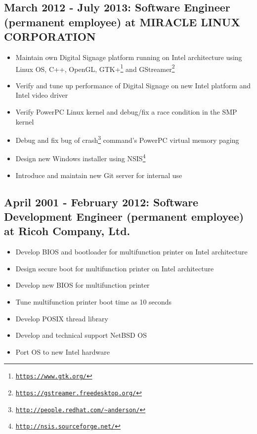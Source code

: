 \documentclass[letterpaper]{article}
\begin{document}
\subsection*{March 2012 - July 2013: Software Engineer (permanent employee) at MIRACLE LINUX CORPORATION}

\begin{itemize}
  \item Maintain own Digital Signage platform running on Intel architecture using Linux OS, C++, OpenGL, GTK+\footnote{\href{https://www.gtk.org/}{\tt https://www.gtk.org/}} and GStreamer\footnote{\href{https://gstreamer.freedesktop.org/}{\tt https://gstreamer.freedesktop.org/}}
  \item Verify and tune up performance of Digital Signage on new Intel platform and Intel video driver
  \item Verify PowerPC Linux kernel and debug/fix a race condition in the SMP kernel
  \item Debug and fix bug of crash\footnote{\href{http://people.redhat.com/{\textasciitilde}anderson/}{\tt http://people.redhat.com/{\textasciitilde}anderson/}} command's PowerPC virtual memory paging
  \item Design new Windows installer using NSIS\footnote{\href{http://nsis.sourceforge.net/}{\tt http://nsis.sourceforge.net/}}
  \item Introduce and maintain new Git server for internal use
\end{itemize}

\subsection*{April 2001 - February 2012: Software Development Engineer (permanent employee) at Ricoh Company, Ltd.}

\begin{itemize}
  \item Develop BIOS and bootloader for multifunction printer on Intel architecture
  \item Design secure boot for multifunction printer on Intel architecture
  \item Develop new BIOS for multifunction printer
  \item Tune multifunction printer boot time as 10 seconds
  \item Develop POSIX thread library
  \item Develop and technical support NetBSD OS
  \item Port OS to new Intel hardware
\end{itemize}
\end{document}
